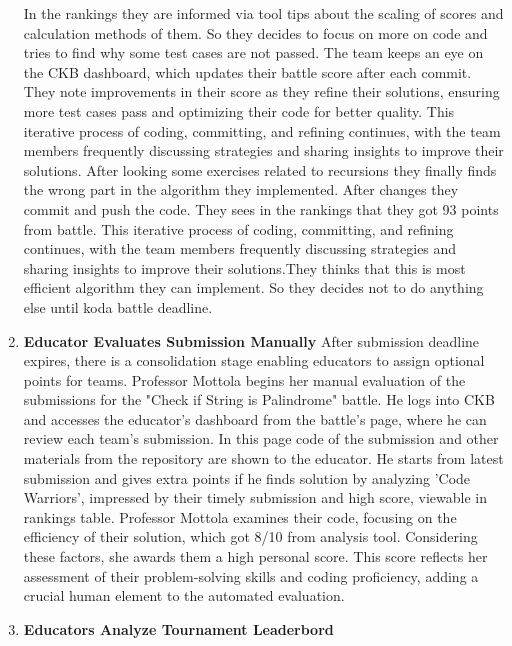 \begin{enumerate}
    In the rankings they are informed via tool tips about the scaling of scores and calculation methods of them. So they decides to focus on more on code and tries to find why some test cases are not passed. The team keeps an eye on the CKB dashboard, which updates their battle score after each commit. They note improvements in their score as they refine their solutions, ensuring more test cases pass and optimizing their code for better quality. This iterative process of coding, committing, and refining continues, with the team members frequently discussing strategies and sharing insights to improve their solutions. After looking some exercises related to recursions they finally finds the wrong part in the algorithm they implemented. After changes they commit and push the code. They sees in the rankings that they got 93 points from battle. This iterative process of coding, committing, and refining continues, with the team members frequently discussing strategies and sharing insights to improve their solutions.They thinks that this is most efficient algorithm they can implement. So they decides not to do anything else until koda battle deadline. \newline
    \item \textbf{Educator Evaluates Submission Manually} \newline
    After submission deadline expires, there is a consolidation stage enabling educators to assign optional points for teams. Professor Mottola begins her manual evaluation of the submissions for the "Check if String is Palindrome" battle. He logs into CKB and accesses the educator's dashboard from the battle's page, where he can review each team's submission. In this page code of the submission and other materials from the repository are shown to the educator. He starts from latest submission and gives extra points if he finds solution by analyzing 'Code Warriors', impressed by their timely submission and high score, viewable in rankings table. Professor Mottola examines their code, focusing on the efficiency of their solution, which got 8/10 from analysis tool. Considering these factors, she awards them a high personal score. This score reflects her assessment of their problem-solving skills and coding proficiency, adding a crucial human element to the automated evaluation. 
    \item \textbf{Educators Analyze Tournament Leaderbord} \newline

\end{enumerate}

